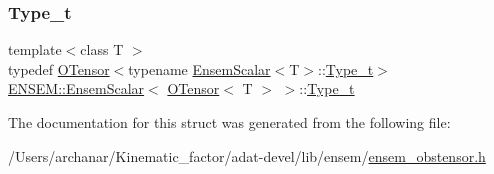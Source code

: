 \subsubsection{\texorpdfstring{Type\_t}{Type\_t}\hspace{0.1cm}{\footnotesize\ttfamily [3/3]}}
{\footnotesize\ttfamily template$<$class T $>$ \\
typedef \mbox{\hyperlink{classENSEM_1_1OTensor}{O\+Tensor}}$<$typename \mbox{\hyperlink{structENSEM_1_1EnsemScalar}{Ensem\+Scalar}}$<$T$>$\+::\mbox{\hyperlink{structENSEM_1_1EnsemScalar_3_01OTensor_3_01T_01_4_01_4_ac7c2eed82696db6f601281499248ff83}{Type\+\_\+t}}$>$ \mbox{\hyperlink{structENSEM_1_1EnsemScalar}{E\+N\+S\+E\+M\+::\+Ensem\+Scalar}}$<$ \mbox{\hyperlink{classENSEM_1_1OTensor}{O\+Tensor}}$<$ T $>$ $>$\+::\mbox{\hyperlink{structENSEM_1_1EnsemScalar_3_01OTensor_3_01T_01_4_01_4_ac7c2eed82696db6f601281499248ff83}{Type\+\_\+t}}}



The documentation for this struct was generated from the following file\+:\begin{DoxyCompactItemize}
\item 
/\+Users/archanar/\+Kinematic\+\_\+factor/adat-\/devel/lib/ensem/\mbox{\hyperlink{adat-devel_2lib_2ensem_2ensem__obstensor_8h}{ensem\+\_\+obstensor.\+h}}\end{DoxyCompactItemize}
